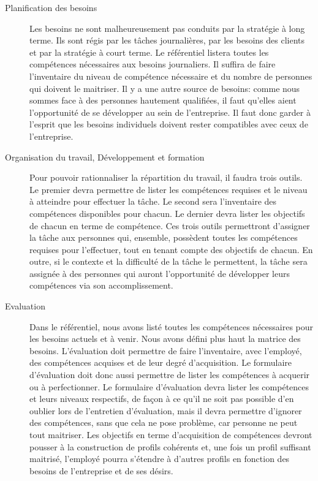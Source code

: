 \begin{description}
  \item[Planification des besoins] 
  Les besoins ne sont malheureusement pas conduits par la stratégie à long terme. Ils sont régis par les tâches journalières, par les besoins des clients et par la stratégie à court terme. Le référentiel listera toutes les compétences nécessaires aux besoins journaliers. Il suffira de faire l'inventaire du niveau de compétence nécessaire et du nombre de personnes qui doivent le maitriser. Il y a une autre source de besoins: comme nous sommes face à des personnes hautement qualifiées, il faut qu'elles aient l'opportunité de se développer au sein de l'entreprise. Il faut donc garder à l'esprit que les besoins individuels doivent rester compatibles avec ceux de l'entreprise. 

  \item[Organisation du travail, Développement et formation]
  Pour pouvoir rationnaliser la répartition du travail, il faudra trois outils. Le premier devra permettre de lister les compétences requises et le niveau à atteindre pour effectuer la tâche. Le second sera l'inventaire des compétences disponibles pour chacun. Le dernier devra lister les objectifs de chacun en terme de compétence. Ces trois outils permettront d'assigner la tâche aux personnes qui, ensemble, possèdent toutes les compétences requises pour l'effectuer, tout en tenant compte des objectifs de chacun. En outre, si le contexte et la difficulté de la tâche le permettent, la tâche sera assignée à des personnes qui auront l'opportunité de développer leurs compétences via son accomplissement. %
  
  \item[Evaluation]
  Dans le référentiel, nous avons listé toutes les compétences nécessaires pour les besoins actuels et à venir. Nous avons défini plus haut la matrice des besoins. L'évaluation doit permettre de faire l'inventaire, avec l'employé, des compétences acquises et de leur degré d'acquisition. Le formulaire d'évaluation doit donc aussi permettre de lister les compétences à acquerir ou à perfectionner. Le formulaire d'évaluation devra lister les compétences et leurs niveaux respectifs, de façon à ce qu'il ne soit pas possible d'en oublier lors de l'entretien d'évaluation, mais il devra permettre d'ignorer des compétences, sans que cela ne pose problème, car personne ne peut tout maitriser. Les objectifs en terme d'acquisition de compétences devront pousser à la construction de profils cohérents et, une fois un profil suffisant maitrisé, l'employé pourra s'étendre à d'autres profils en fonction des besoins de l'entreprise et de ses désirs. 
  

\end{description}
